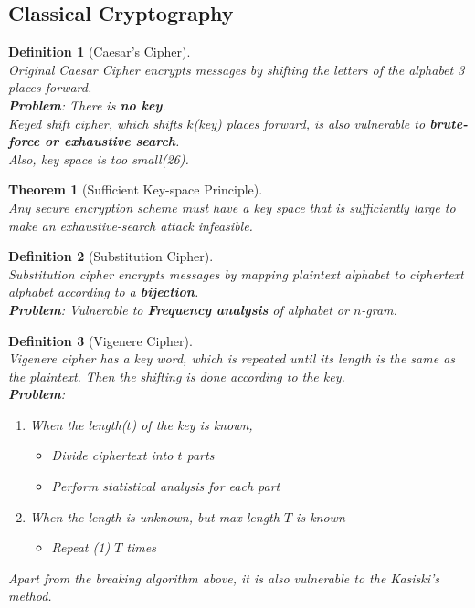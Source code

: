 \documentclass[12pt]{article}
\newtheorem{definition}{Definition}[section]
\newtheorem{theorem}{Theorem}[section]
\theoremstyle{definition}
\begin{document}
\subsection{Classical Cryptography}
\begin{definition}[Caesar's Cipher]
\hfill\\\normalfont Original Caesar Cipher encrypts messages by shifting the letters of the alphabet 3 places forward. \\
\textbf{Problem}: There is \textbf{no key}.\\
Keyed shift cipher, which shifts $k$(key) places forward, is also vulnerable to \textbf{brute-force or exhaustive search}.\\
Also, key space is too small(26).
\end{definition}
\begin{theorem}[Sufficient Key-space Principle]
\hfill\\\normalfont Any secure encryption scheme must have a key space that is sufficiently large to make an exhaustive-search attack infeasible.
\end{theorem}
\begin{definition}[Substitution Cipher]
\hfill\\\normalfont Substitution cipher encrypts messages by mapping plaintext alphabet to ciphertext alphabet according to a \textbf{bijection}.\\
\textbf{Problem}: Vulnerable to \textbf{Frequency analysis} of alphabet or $n$-gram.
\end{definition}
\begin{definition}[Vigenere Cipher]
\hfill\\\normalfont Vigenere cipher has a key word, which is repeated until its length is the same as the plaintext. Then the shifting is done according to the key.\\
\textbf{Problem}:
\begin{enumerate}
  \item When the length($t$) of the key is known,
  \begin{itemize}
    \item Divide ciphertext into $t$ parts
    \item Perform statistical analysis for each part
  \end{itemize}
  \item When the length is unknown, but max length $T$ is known
  \begin{itemize}
    \item Repeat (1) $T$ times
  \end{itemize}
\end{enumerate}
Apart from the breaking algorithm above, it is also vulnerable to the Kasiski's method.
\end{definition}
\end{document}
